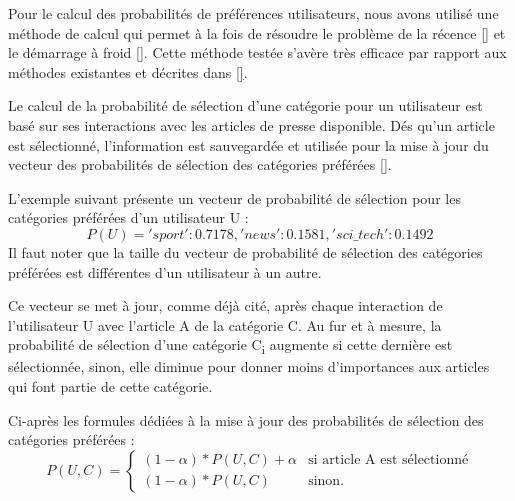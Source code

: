         Pour le calcul des probabilités de préférences utilisateurs, nous avons utilisé une méthode de calcul qui permet à la fois de résoudre le problème de la récence \autoref{} et le démarrage à froid \autoref{}. Cette méthode testée s'avère très efficace par rapport aux méthodes existantes et décrites dans \autoref{}.

        Le calcul de la probabilité de sélection d'une catégorie pour un utilisateur est basé sur ses interactions avec les articles de presse disponible. Dés qu'un article est sélectionné, l'information est sauvegardée et utilisée pour la mise à jour du vecteur des probabilités de sélection des catégories préférées \autoref{}.

        L'exemple suivant présente un vecteur de probabilité de sélection pour les catégories préférées d'un utilisateur U :
            \[P(U) = {'sport': 0.7178, 'news': 0.1581, 'sci\_tech': 0.1492}\]            
        Il faut noter que la taille du vecteur de probabilité de sélection des catégories préférées est différentes d'un utilisateur à un autre.

        Ce vecteur se met à jour, comme déjà cité, après chaque interaction de l'utilisateur U avec l'article A de la catégorie C. Au fur et à mesure, la probabilité de sélection d'une catégorie C\textsubscript{i} augmente si cette dernière est sélectionnée, sinon, elle diminue pour donner moins d'importances aux articles qui font partie de cette catégorie.

        Ci-après les formules dédiées à la mise à jour des probabilités de sélection des catégories préférées :\\
            \[
            P(U, C) =
            \begin{cases}
                (1-{\alpha}) * {P(U, C)} + {\alpha} & \text{si } \text{article A est sélectionné} \\
                (1-{\alpha}) * {P(U, C)} & \text{sinon.}
            \end{cases}
            \]

